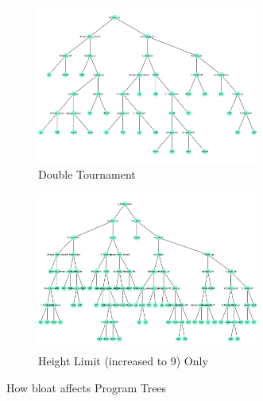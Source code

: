 \documentclass[12pt]{article}
\begin{document}
\begin{figure}[ht]

\centering
\begin{subfigure}{1\textwidth}
\centering
\includegraphics[width=0.8\textwidth]{Figures/bloat_control}
\caption{Double Tournament}
\label{fig:bloat_control}
\end{subfigure}
\begin{subfigure}{1\textwidth}
\centering
\includegraphics[width=0.8\textwidth]{Figures/height_limit_only}
\caption{Height Limit (increased to 9) Only}
\label{fig:height_limit_only}
\end{subfigure}

\caption{How bloat affects Program Trees}
\label{fig:bloat}
\end{figure}
\end{document}
